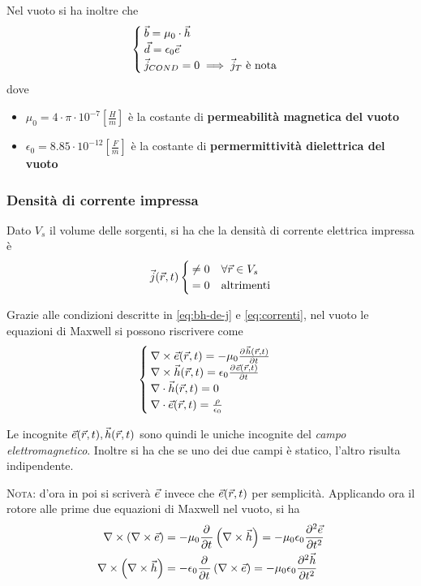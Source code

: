 Nel vuoto si ha inoltre che
\begin{equation}
	\begin{cases}
	  \b = \mu_0 \cdot \h \\
		\d = \epsilon_0 \e \\
		\vec{j}_{COND} = 0 \implies \jt \text{ è nota} \\
	\end{cases}
  \label{eq:bh-de-j}
\end{equation}
dove
\begin{itemize}
  \item $\mu_0 = 4\cdot \pi \cdot 10^{-7} \left[\frac{H}{m}\right]$ è la costante di \textbf{permeabilità
  magnetica del vuoto}
  \item $\epsilon_0 = 8.85 \cdot 10^{-12} \left[\frac{F}{m}\right]$ è la costante di \textbf{permermittività
  dielettrica del vuoto}
\end{itemize}

\subsubsection{Densità di corrente impressa}
Dato $V_s$ il volume delle sorgenti, si ha che la densità di corrente elettrica impressa è
\begin{equation} \vec{j}(\r,t)
  \begin{cases}
    \neq 0 & \forall \r \in V_s \\
    =0 & \text{altrimenti}
  \end{cases}
  \label{eq:correnti}
\end{equation}

Grazie alle condizioni descritte in \eqref{eq:bh-de-j} e \eqref{eq:correnti}, nel vuoto
le equazioni di Maxwell si possono riscrivere come
\begin{equation}\begin{cases}
  \rot \ert = -\mu_0 \deriv{\hrt}{t} \\
  \rot \hrt = \epsilon_0 \deriv{\ert}{t}\\
  \diverg \hrt = 0 \\ \diverg\ert = \frac{\rho}{\epsilon_0}
\end{cases}\label{eq:maxwell-vuoto}\end{equation}

Le incognite $\ert, \hrt$ sono quindi le uniche incognite del \emph{campo elettromagnetico}.
Inoltre si ha che se uno dei due campi è statico, l'altro risulta indipendente.

\textsc{Nota:} d'ora in poi si scriverà $\e$ invece che $\ert$ per semplicità.
Applicando ora il rotore alle prime due equazioni di Maxwell nel vuoto, si ha
\begin{equation}\begin{split}
  \rot\left(\rot\e\right) &= -\mu_0 \deriv{}{t} \left(\rot\h\right) = -\mu_0\epsilon_0 \deriv[2]{\e}{t} \\
  \rot\left(\rot\h\right) &= -\epsilon_0 \deriv{}{t} \left(\rot\e\right) = -\mu_0\epsilon_0 \deriv[2]{\h}{t} \\
\end{split}\end{equation}

